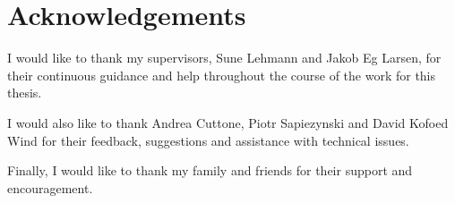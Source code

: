 \chapter{Acknowledgements}

I would like to thank my supervisors, Sune Lehmann and Jakob Eg Larsen, for
their continuous guidance and help throughout the course of the work for this
thesis.

I would also like to thank Andrea Cuttone, Piotr Sapiezynski and David Kofoed
Wind for their feedback, suggestions and assistance with technical issues.

Finally, I would like to thank my family and friends for their support and
encouragement.

